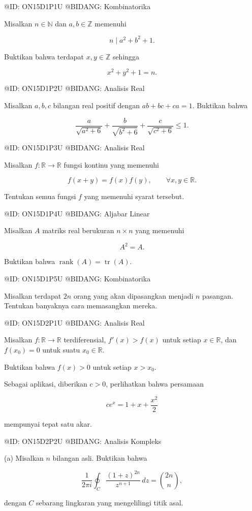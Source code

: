 @ID: ON15D1P1U
@BIDANG: Kombinatorika

Misalkan $n\in\mathbb N$ dan $a,b\in\mathbb Z$ memenuhi

$$
n\mid a^2+b^2+1.
$$

Buktikan bahwa terdapat $x,y\in\mathbb Z$ sehingga

$$
x^2+y^2+1=n.
$$

@ID: ON15D1P2U
@BIDANG: Analisis Real

Misalkan $a,b,c$ bilangan real positif dengan $ab+bc+ca=1$. Buktikan bahwa

$$
\frac{a}{\sqrt{a^2+6}}
+
\frac{b}{\sqrt{b^2+6}}
+
\frac{c}{\sqrt{c^2+6}}
\le1.
$$

@ID: ON15D1P3U
@BIDANG: Analisis Real

Misalkan $f:\mathbb R\to\mathbb R$ fungsi kontinu yang memenuhi

$$
f(x+y)=f(x)f(y),
\qquad \forall x,y\in\mathbb R.
$$

Tentukan semua fungsi $f$ yang memenuhi syarat tersebut.

@ID: ON15D1P4U
@BIDANG: Aljabar Linear

Misalkan $A$ matriks real berukuran $n\times n$ yang memenuhi

$$
A^2=A.
$$

Buktikan bahwa $\operatorname{rank}(A)=\operatorname{tr}(A)$.

@ID: ON15D1P5U
@BIDANG: Kombinatorika

Misalkan terdapat $2n$ orang yang akan dipasangkan menjadi $n$ pasangan. Tentukan banyaknya cara memasangkan mereka.

@ID: ON15D2P1U
@BIDANG: Analisis Real

Misalkan $f:\mathbb R\to\mathbb R$ terdiferensial, $f'(x)>f(x)$ untuk setiap $x\in\mathbb R$, dan $f(x_0)=0$ untuk suatu $x_0\in\mathbb R$.

Buktikan bahwa $f(x)>0$ untuk setiap $x>x_0$.

Sebagai aplikasi, diberikan $c>0$, perlihatkan bahwa persamaan

$$
ce^x=1+x+\frac{x^2}{2}
$$

mempunyai tepat satu akar.

@ID: ON15D2P2U
@BIDANG: Analisis Kompleks

(a) Misalkan $n$ bilangan asli. Buktikan bahwa

$$
\frac{1}{2\pi i}\oint_C\frac{(1+z)^{2n}}{z^{n+1}}\,dz
=
\binom{2n}{n},
$$

dengan $C$ sebarang lingkaran yang mengelilingi titik asal.

